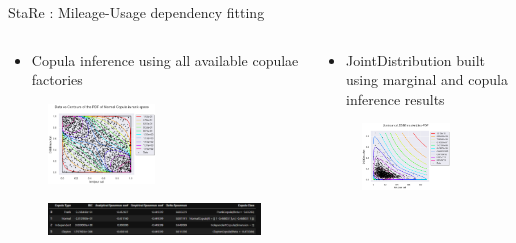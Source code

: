 \documentclass{renault-template}
\begin{document}
\begin{frame}{StaRe : Mileage-Usage dependency fitting}
  \begin{columns}[t]
    \fontsize{8}{8}\selectfont

    \begin{column}{0.5\textwidth}
      \begin{itemize}
      \item Copula inference using all available copulae factories
      \end{itemize}
      \begin{figure}
        \includegraphics[width=0.5\textwidth]{Illustration_StaRe/fit_copula.png}
      \end{figure}
      \begin{figure}
        \includegraphics[width=\textwidth]{Illustration_StaRe/fit_copula_table.png}
      \end{figure}
    \end{column}

    \begin{column}{0.5\textwidth}
      \begin{itemize}
      \item JointDistribution built using marginal and copula inference results
      \end{itemize}
      \begin{figure}
        \includegraphics[width=0.8\textwidth]{Illustration_StaRe/joint_dist.png}
      \end{figure}
    \end{column}
  \end{columns}
\end{frame}
\end{document}
